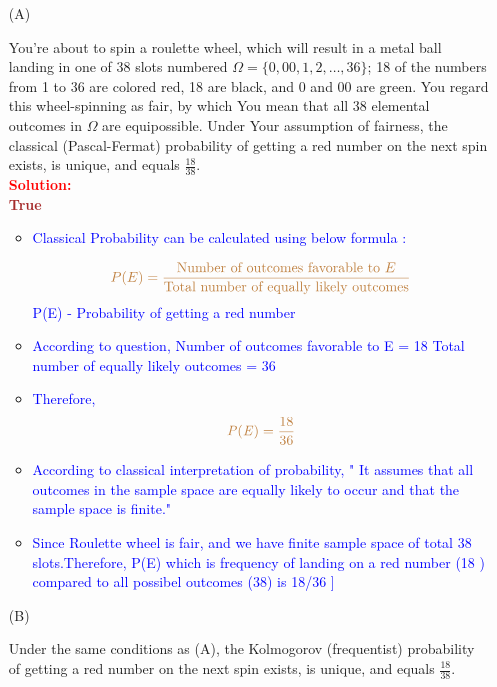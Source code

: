 \documentclass[12pt]{article}
\begin{document}
\begin{itemize}

\item[(A)]

You're about to spin a roulette wheel, which will result in a metal ball
landing in one of 38 slots numbered $\Omega = \{ 0, 00, 1, 2, \dots, 36
\}$; 18 of the numbers from 1 to 36 are colored red, 18 are black, and 0
and 00 are green. You regard this wheel-spinning as fair, by which You mean
that all 38 elemental outcomes in $\Omega$ are equipossible. Under Your
assumption of fairness, the classical (Pascal-Fermat) probability of
getting a red number on the next spin exists, is unique, and equals $\frac{
18 }{ 38 }$. \\
\textcolor{red}{\textbf{Solution:}} \\
\textbf{\textcolor{brown}{\textbf{True}}}
    \begin{itemize}
        \item {\textcolor{blue}{Classical Probability can be calculated using below formula :}}

        \[
            \color{brown} P(E) = \frac{\text{Number of outcomes favorable to } E}{\text{Total number of equally likely outcomes}}
        \]
         \textcolor{blue}{P(E) - Probability of getting a red number}

    
        \item \textcolor{blue}{According to question, }
        \textcolor{blue}{Number of outcomes favorable to  E = 18}
        \textcolor{blue}{Total number of equally likely outcomes = 36}
          \item \textcolor{blue}{Therefore,}
        \[
            \textcolor{brown}{\mathit{P(E)} = \frac{18}{36}}
        \]
         \item \textcolor{blue}{According to classical interpretation of probability, " It assumes that all outcomes in the sample space are equally likely to occur and that the sample space is finite."}
           \item \textcolor{blue}{Since Roulette wheel is fair, and we have finite sample space of total 38 slots.Therefore, P(E) which is frequency of landing on a red number (18 ) compared to all possibel outcomes (38) is 18/36 ]}
    
    \end{itemize}   

\item[(B)]

Under the same conditions as (A), the Kolmogorov (frequentist) probability
of getting a red number on the next spin exists, is unique, and equals
$\frac{ 18 }{ 38 }$.



\end{itemize}
\end{document}
